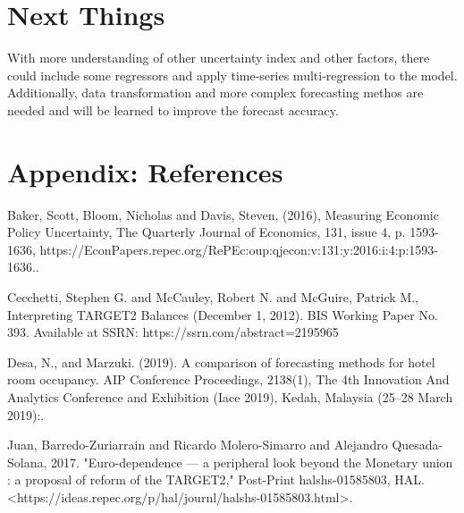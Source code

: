 \documentclass[12pt]{article}
\begin{document}
\pagebreak
\section{Next Things}

With more understanding of other uncertainty index and other factors, there could include some regressors and apply time-series multi-regression to the model. Additionally, data transformation and more complex forecasting methos are needed and will be learned to improve the forecast accuracy. 


\singlespacing
\setlength\bibsep{0pt}



\clearpage

\onehalfspacing

\section*{Appendix: References} \label{sec:references}

Baker, Scott, Bloom, Nicholas and Davis, Steven, (2016), Measuring Economic Policy Uncertainty, The Quarterly Journal of Economics, 131, issue 4, p. 1593-1636, https://EconPapers.repec.org/RePEc:oup:qjecon:v:131:y:2016:i:4:p:1593-1636..

Cecchetti, Stephen G. and McCauley, Robert N. and McGuire, Patrick M., Interpreting TARGET2 Balances (December 1, 2012). BIS Working Paper No. 393. Available at SSRN: https://ssrn.com/abstract=2195965 

Desa, N., and Marzuki. (2019). A comparison of forecasting methods for hotel room occupancy. AIP Conference Proceedings, 2138(1), The 4th Innovation And Analytics Conference and Exhibition (Iace 2019), Kedah, Malaysia (25–28 March 2019):.

Juan, Barredo-Zuriarrain and Ricardo Molero-Simarro and Alejandro Quesada-Solana, 2017. "Euro-dependence — a peripheral look beyond the Monetary union : a proposal of reform of the TARGET2," Post-Print halshs-01585803, HAL. <https://ideas.repec.org/p/hal/journl/halshs-01585803.html>. 
\end{document}
